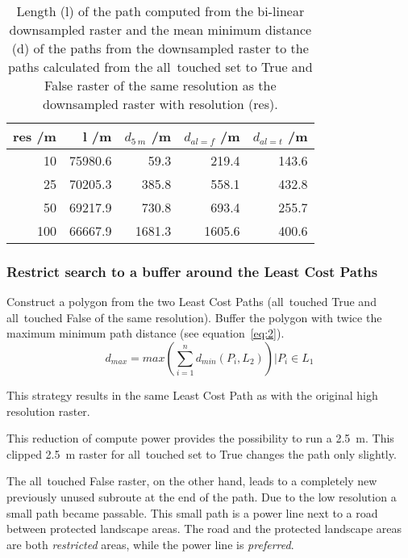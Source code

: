 \begin{table}[h!]
	\caption{Length (l) of the path computed from the bi-linear downsampled raster and the mean minimum distance (d) of the paths from the downsampled raster to the paths calculated from the all~touched set to True and False raster of the same resolution as the downsampled raster with resolution (res).}
	\label{tab:5}
	\centering
	\begin{tabular}{ r  r  r  r  r}
		res /m & l /m  & $d_{5~m}$ /m &  $d_{al=f}$ /m & $d_{al=t}$ /m \\
		\hline
		
		10  & 75980.6 &    59.3 &  219.4 & 143.6\\
		25  & 70205.3 &   385.8 &  558.1 & 432.8\\
		50  & 69217.9 &   730.8 &  693.4 & 255.7\\
		100 & 66667.9 &  1681.3 & 1605.6 & 400.6\\
		
	\end{tabular}
\end{table}


\subsubsection{Restrict search to a buffer around the Least Cost Paths}



Construct a polygon from the two Least Cost Paths (all~touched True and all~touched False of the same resolution).
Buffer the polygon with twice the maximum  minimum path distance  (see equation~\ref{eq:2}).
\begin{equation}
	\label{eq:2}
	d_{max} = max(\sum_{i=1}^{n} d_{min}(P_i, L_2)) \Bigr\vert P_i \in L_1
\end{equation}

This strategy results in the same Least Cost Path as with the original high resolution raster.

This reduction of compute power provides the possibility  to run a 2.5~m.
This clipped 2.5~m raster for all~touched set to True changes the path only slightly. 

The all~touched False raster, on the other hand, leads to a completely new previously unused subroute at the end of the path.
Due to the low resolution a small path became passable.
This small path is a power line next to a road between protected landscape areas.
The road and the protected landscape areas are both \textit{restricted} areas, while the power line is \textit{preferred}.




